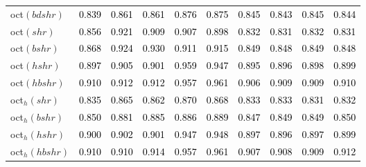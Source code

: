 \begin{tabular}[t]{l|ccccccccc}
oct$(bdshr)$ & \textcolor{black}{0.839} & \textcolor{black}{0.861} & \textcolor{black}{0.861} & \textcolor{black}{0.876} & \textcolor{black}{0.875} & \textcolor{black}{0.845} & \textcolor{black}{0.843} & \textcolor{black}{0.845} & \textcolor{black}{0.844}\\
oct$(shr)$ & \textcolor{black}{0.856} & \textcolor{black}{0.921} & \textcolor{black}{0.909} & \textcolor{black}{0.907} & \textcolor{black}{0.898} & \textcolor{black}{0.832} & \textcolor{black}{0.831} & \textcolor{black}{0.832} & \textcolor{black}{0.831}\\
oct$(bshr)$ & \textcolor{black}{0.868} & \textcolor{black}{0.924} & \textcolor{black}{0.930} & \textcolor{black}{0.911} & \textcolor{black}{0.915} & \textcolor{black}{0.849} & \textcolor{black}{0.848} & \textcolor{black}{0.849} & \textcolor{black}{0.848}\\
oct$(hshr)$ & \textcolor{black}{0.897} & \textcolor{black}{0.905} & \textcolor{black}{0.901} & \textcolor{black}{0.959} & \textcolor{black}{0.947} & \textcolor{black}{0.895} & \textcolor{black}{0.896} & \textcolor{black}{0.898} & \textcolor{black}{0.899}\\
oct$(hbshr)$ & \textcolor{black}{0.910} & \textcolor{black}{0.912} & \textcolor{black}{0.912} & \textcolor{black}{0.957} & \textcolor{black}{0.961} & \textcolor{black}{0.906} & \textcolor{black}{0.909} & \textcolor{black}{0.909} & \textcolor{black}{0.910}\\
oct$_h(shr)$ & \textcolor{black}{0.835} & \textcolor{black}{0.865} & \textcolor{black}{0.862} & \textcolor{black}{0.870} & \textcolor{black}{0.868} & \textcolor{black}{0.833} & \textcolor{black}{0.833} & \textcolor{black}{0.831} & \textcolor{black}{0.832}\\
oct$_h(bshr)$ & \textcolor{black}{0.850} & \textcolor{black}{0.881} & \textcolor{black}{0.885} & \textcolor{black}{0.886} & \textcolor{black}{0.889} & \textcolor{black}{0.847} & \textcolor{black}{0.849} & \textcolor{black}{0.849} & \textcolor{black}{0.850}\\
oct$_h(hshr)$ & \textcolor{black}{0.900} & \textcolor{black}{0.902} & \textcolor{black}{0.901} & \textcolor{black}{0.947} & \textcolor{black}{0.948} & \textcolor{black}{0.897} & \textcolor{black}{0.896} & \textcolor{black}{0.897} & \textcolor{black}{0.899}\\
oct$_h(hbshr)$ & \textcolor{black}{0.910} & \textcolor{black}{0.910} & \textcolor{black}{0.914} & \textcolor{black}{0.957} & \textcolor{black}{0.961} & \textcolor{black}{0.907} & \textcolor{black}{0.908} & \textcolor{black}{0.909} & \textcolor{black}{0.912}\\
\bottomrule
\end{tabular}
